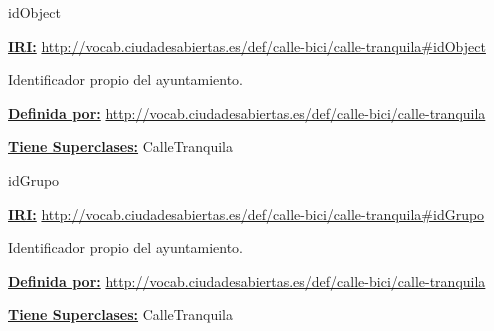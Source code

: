 \begin{mybox}{idObject}
\begin{flushleft}
\underline{\textbf{IRI:}}
\url{http://vocab.ciudadesabiertas.es/def/calle-bici/calle-tranquila#idObject}
\newline

Identificador propio del ayuntamiento.
\newline


\underline{\textbf{Definida por:}}
\url{http://vocab.ciudadesabiertas.es/def/calle-bici/calle-tranquila}
\newline

\underline{\textbf{Tiene Superclases:}}
\newline CalleTranquila

\end{flushleft}
\end{mybox}




\begin{mybox}{idGrupo}
\begin{flushleft}
\underline{\textbf{IRI:}}
\url{http://vocab.ciudadesabiertas.es/def/calle-bici/calle-tranquila#idGrupo}
\newline

Identificador propio del ayuntamiento. 
\newline

\underline{\textbf{Definida por:}}
\url{http://vocab.ciudadesabiertas.es/def/calle-bici/calle-tranquila}
\newline

\underline{\textbf{Tiene Superclases:}}
\newline CalleTranquila

\end{flushleft}
\end{mybox}




